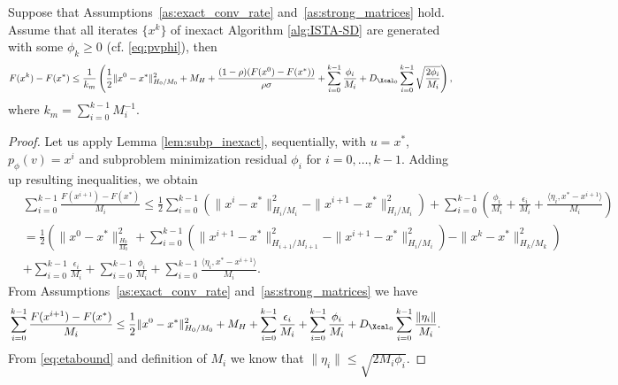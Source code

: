 \documentclass[11pt]{article}
\numberwithin{equation}{section}
\begin{document}
  \begin{theorem}\label{th:inexact_conv_rate}
 Suppose that Assumptions~\ref{as:exact_conv_rate} and~\ref{as:strong_matrices} hold. 
 Assume that all iterates $\{x^k\}$ of inexact Algorithm \ref{alg:ISTA-SD} are generated with some $\phi_k\geq 0$ (cf. \eqref{eq:pvphi}), then
 \begin{align}
     \label{eq:bound_F_F*}
     F(x^k) - F(x^*) \leq 
     \frac{1}{k_m} \left( \frac{1}{2} \|x^0-x^*\|_{H_0/M_0}^2 
     + M_H+ \frac{(1-\rho)(F(x^0)-F(x^*))}{\rho\sigma} 
     + \sum_{i=0}^{k-1}\frac{\phi_i}{M_i}
     + D_{\Xcal_0}\sum_{i=0}^{k-1} \sqrt{\frac{2\phi_i}{M_i}} \right),
 \end{align}
 where $k_m=\sum_{i=0}^{k-1}M_i^{-1}$.
 \end{theorem}


 \begin{proof}
     Let us apply Lemma \ref{lem:subp_inexact}, sequentially, with $u=x^*$, $p_{\phi}(v)=x^i$ and subproblem minimization residual $\phi_i$ for $i=0, \ldots, k-1$. Adding up resulting inequalities, we obtain  
     \begin{align}
         &\sum_{i=0}^{k-1} \frac{F(x^{i+1}) - F(x^*)}{M_i}\leq 
         \frac{1}{2} \sum_{i=0}^{k-1} \left(\|x^i-x^*\|_{H_i/M_i}^2 
         - \|x^{i+1}-x^*\|_{H_i/M_i}^2 \right) 
         + \sum_{i=0}^{k-1}( \frac{\phi_i}{M_i} + \frac{\epsilon_i}{M_i} +\frac{\langle \eta_i,x^* - x^{i+1} \rangle}{M_i})\nonumber \\
         \label{equ:bound_F_diff}
         &= 
          \frac{1}{2} \left( \|x^0-x^*\|_{\frac{H_0}{M_0}}^2 
         + \sum_{i=0}^{k-1}(\|x^{i+1} - x^*\|^2_{H_{i+1}/M_{i+1}}-\|x^{i+1} - x^*\|^2_{H_i/M_i})
         - \|x^k-x^*\|_{H_k/M_k}^2 \right) \\
         &\nonumber + \sum_{i=0}^{k-1} \frac{\epsilon_i}{M_i} 
         + \sum_{i=0}^{k-1} \frac{\phi_i}{M_i} 
         + \sum_{i=0}^{k-1} \frac{\langle \eta_i,x^* - x^{i+1} \rangle}{M_i}.
         \end{align}
         From Assumptions~\ref{as:exact_conv_rate} and~\ref{as:strong_matrices} we have
         \begin{align*}
         &\sum_{i=0}^{k-1} \frac{F(x^{i+1}) - F(x^*)}{M_i} \leq 
         \frac{1}{2} \|x^0-x^*\|_{H_0/M_0}^2 +M_H
         + \sum_{i=0}^{k-1} \frac{\epsilon_i}{M_i} 
         + \sum_{i=0}^{k-1} \frac{\phi_i}{M_i} 
         + D_{\Xcal_0}\sum_{i=0}^{k-1} \frac{\|\eta_i\|}{M_i}. 
         \end{align*}
         From \eqref{eq:etabound}  and definition of $M_i$ we know that $\|\eta_i\|\leq \sqrt{2M_i\phi_i}$. 

\end{proof}
\end{document}
